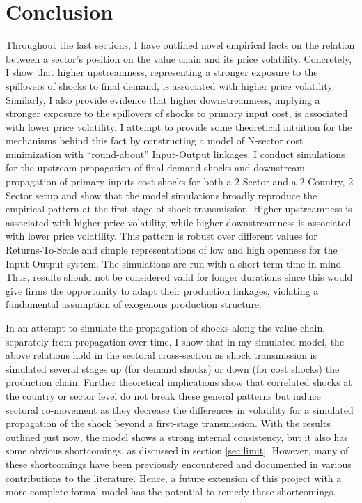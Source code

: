 \section{Conclusion}
\label{sec:conc}

Throughout the last sections, I have outlined novel empirical facts on the relation between a sector's position on the value chain 
and its price volatility. Concretely, I show that higher upstreamness, representing a stronger exposure to the spillovers of shocks 
to final demand, is associated with higher price volatility. Similarly, I also provide evidence that higher downstreamness,
implying a stronger exposure to the spillovers of shocks to primary input cost, is associated with lower price volatility. I attempt 
to provide some theoretical intuition for the mechanisms behind this fact by constructing a model of N-sector cost minimization
with ``round-about'' Input-Output linkages. I conduct simulations for the upstream propagation of final demand shocks and downstream 
propagation of primary inputs cost shocks for both a 2-Sector and a 2-Country, 2-Sector setup and show that the model simulations 
broadly reproduce the empirical pattern at the first stage of shock transmission. Higher upstreamness is associated with higher 
price volatility, while higher downstreamness is associated with lower price volatility. This pattern is robust over different values for
Returns-To-Scale and simple representations of low and high openness for the Input-Output system. The simulations are run with a short-term 
time in mind. Thus, results should not be considered valid for longer durations since this would give firms the opportunity to adapt 
their production linkages, violating a fundamental assumption of exogenous production structure.

In an attempt to simulate the propagation of shocks along the value chain, separately from propagation over time, I show that in my 
simulated model, the above relations hold in the sectoral cross-section as shock transmission is simulated several stages up 
(for demand shocks) or down (for cost shocks) the production chain. Further theoretical implications show that correlated shocks at 
the country or sector level do not break these general patterns but induce sectoral co-movement as they decrease the differences in 
volatility for a simulated propagation of the shock beyond a first-stage transmission. With the results outlined just now, the model 
shows a strong internal consistency, but it also has some obvious shortcomings, as discussed in section \ref{sec:limit}. However, many of 
these shortcomings have been previously encountered and documented in various contributions to the literature. Hence, a future extension 
of this project with a more complete formal model has the potential to remedy these shortcomings.


